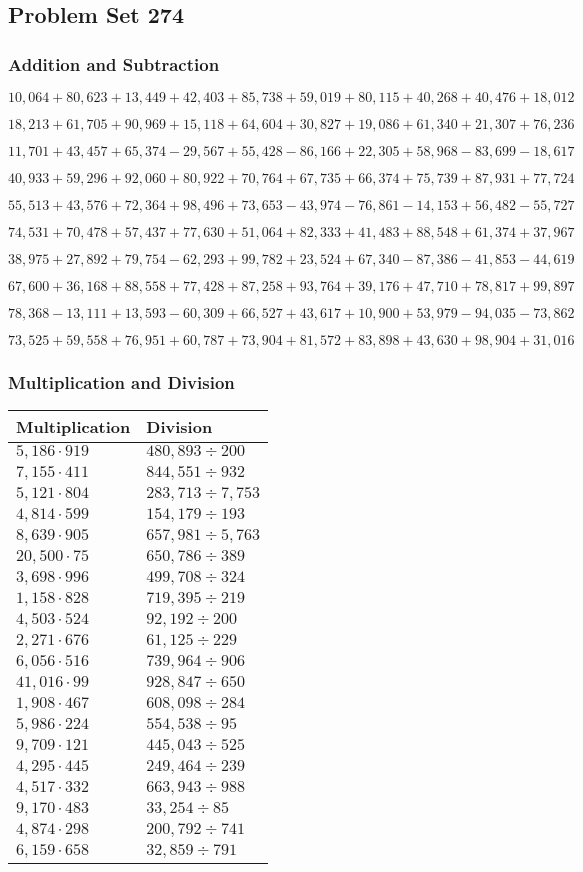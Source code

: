 \hypertarget{problem-set-274}{%
\subsection{Problem Set 274}\label{problem-set-274}}

\hypertarget{addition-and-subtraction}{%
\subsubsection{Addition and
Subtraction}\label{addition-and-subtraction}}

\(10,064+80,623+13,449+42,403+85,738+59,019+80,115+40,268+40,476+18,012\)

\(18,213+61,705+90,969+15,118+64,604+30,827+19,086+61,340+21,307+76,236\)

\(11,701+43,457+65,374-29,567+55,428-86,166+22,305+58,968-83,699-18,617\)

\(40,933+59,296+92,060+80,922+70,764+67,735+66,374+75,739+87,931+77,724\)

\(55,513+43,576+72,364+98,496+73,653-43,974-76,861-14,153+56,482-55,727\)

\(74,531+70,478+57,437+77,630+51,064+82,333+41,483+88,548+61,374+37,967\)

\(38,975+27,892+79,754-62,293+99,782+23,524+67,340-87,386-41,853-44,619\)

\(67,600+36,168+88,558+77,428+87,258+93,764+39,176+47,710+78,817+99,897\)

\(78,368-13,111+13,593-60,309+66,527+43,617+10,900+53,979-94,035-73,862\)

\(73,525+59,558+76,951+60,787+73,904+81,572+83,898+43,630+98,904+31,016\)

\hypertarget{multiplication-and-division}{%
\subsubsection{Multiplication and
Division}\label{multiplication-and-division}}

\begin{longtable}[]{@{}ll@{}}
\toprule
Multiplication & Division\tabularnewline
\midrule
\endhead
\(5,186\cdot919\) & \(480,893÷200\)\tabularnewline
\(7,155\cdot411\) & \(844,551÷932\)\tabularnewline
\(5,121\cdot804\) & \(283,713÷7,753\)\tabularnewline
\(4,814\cdot599\) & \(154,179÷193\)\tabularnewline
\(8,639\cdot905\) & \(657,981÷5,763\)\tabularnewline
\(20,500\cdot75\) & \(650,786÷389\)\tabularnewline
\(3,698\cdot996\) & \(499,708÷324\)\tabularnewline
\(1,158\cdot828\) & \(719,395÷219\)\tabularnewline
\(4,503\cdot524\) & \(92,192÷200\)\tabularnewline
\(2,271\cdot676\) & \(61,125÷229\)\tabularnewline
\(6,056\cdot516\) & \(739,964÷906\)\tabularnewline
\(41,016\cdot99\) & \(928,847÷650\)\tabularnewline
\(1,908\cdot467\) & \(608,098÷284\)\tabularnewline
\(5,986\cdot224\) & \(554,538÷95\)\tabularnewline
\(9,709\cdot121\) & \(445,043÷525\)\tabularnewline
\(4,295\cdot445\) & \(249,464÷239\)\tabularnewline
\(4,517\cdot332\) & \(663,943÷988\)\tabularnewline
\(9,170\cdot483\) & \(33,254÷85\)\tabularnewline
\(4,874\cdot298\) & \(200,792÷741\)\tabularnewline
\(6,159\cdot658\) & \(32,859÷791\)\tabularnewline
\bottomrule
\end{longtable}
